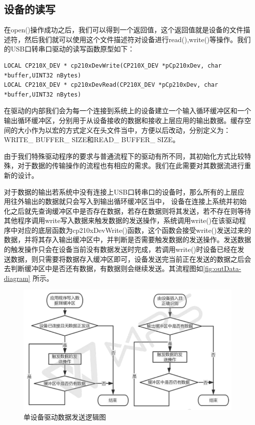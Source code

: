 \subsection{设备的读写}\label{sec:设备的读写}
	在open()操作成功之后，我们可以得到一个返回值，这个返回值就是设备的文件描述符，然后我们就可以使用这个文件描述符对设备进行read(),write()等操作。我们的USB口转串口驱动的读写函数原型如下：

\lstset{language=C}
\begin{lstlisting}
LOCAL CP210X_DEV * cp210xDevWrite(CP210X_DEV *pCp210xDev, char *buffer,UINT32 nBytes)
LOCAL CP210X_DEV * cp210xDevRead(CP210X_DEV *pCp210xDev, char *buffer,UINT32 nBytes)
\end{lstlisting}

	在驱动的内部我们会为每一个连接到系统上的设备建立一个输入循环缓冲区和一个输出循环缓冲区，分别用于从设备接收的数据和接收上层应用的输出数据。缓存空间的大小作为以宏的方式定义在头文件当中，方便以后改动，分别定义为：WRITE\_ BUFFER\_ SIZE和READ\_ BUFFER\_ SIZE。
	
	由于我们特殊驱动程序的要求与普通流程下的驱动有所不同，其初始化方式比较特殊，对于数据的传输操作的流程也有相应的需求。我们在此需要对其数据流进行重新的设计。
	
	对于数据的输出若系统中没有连接上USB口转串口的设备时，那么所有的上层应用往外输出的数据就只会写入到输出循环缓冲区当中，	
	设备在连接上系统并初始化之后就先查询缓冲区中是否存在数据，若存在数据则将其发送，若不存在则等待其他程序调用write写入数据来触发数据的发送操作，系统调用write()在该驱动程序中对应的底层函数为cp210xDevWrite()函数，这个函数会接受write()发送过来的数据，并将其存入输出缓冲区中，并判断是否需要触发数据的发送操作。发送数据的触发操作只会在设备当前没有数据发送时完成，若调用write()时设备已经在发送数据，则只需要将数据存入缓冲区即可，设备发送完当前正在发送的数据之后会去判断缓冲区中是否还有数据，有数据则会继续发送。其流程图如\autoref{fig:outData-diagram} 所示。

\begin{figure}[!h]
\centering
\includegraphics[width=1.0\textwidth]{./graphics/SDevDataSend.pdf}
\caption{单设备驱动数据发送逻辑图}\label{fig:outData-diagram}
\end{figure}

